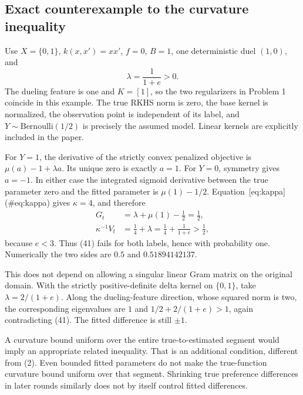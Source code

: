 \documentclass[10pt]{article}
\begin{document}
\subsection*{Exact counterexample to the curvature inequality}
Use \(X=\{0,1\}\), \(k(x,x')=xx'\), \(f=0\), \(B=1\), one deterministic duel \((1,0)\), and \[\lambda=\frac1{1+e}>0.\] The dueling feature is one and \(K=[1]\), so the two regularizers in Problem 1 coincide in this example. The true RKHS norm is zero, the base kernel is normalized, the observation point is independent of its label, and \(Y\sim\mathrm{Bernoulli}(1/2)\) is precisely the assumed model. Linear kernels are explicitly included in the paper.\par
For \(Y=1\), the derivative of the strictly convex penalized objective is \(\mu(a)-1+\lambda a\). Its unique zero is exactly \(a=1\). For \(Y=0\), symmetry gives \(a=-1\). In either case the integrated sigmoid derivative between the true parameter zero and the fitted parameter is \(\mu(1)-1/2\). Equation [eq:kappa] (\#eq:kappa) gives \(\kappa=4\), and therefore \[\begin{aligned}
G_t&=\lambda+\mu(1)-\tfrac12=\tfrac12,\\
\kappa^{-1}V_t&=\tfrac14+\lambda
=\tfrac14+\frac1{1+e}>\tfrac12 ,\end{aligned}\] because \(e<3\). Thus (41) fails for both labels, hence with probability one. Numerically the two sides are \(0.5\) and \(0.51894142137\).\par
This does not depend on allowing a singular linear Gram matrix on the original domain. With the strictly positive-definite delta kernel on \(\{0,1\}\), take \(\lambda=2/(1+e)\). Along the dueling-feature direction, whose squared norm is two, the corresponding eigenvalues are \(1\) and \(1/2+2/(1+e)>1\), again contradicting (41). The fitted difference is still \(\pm1\).\par
A curvature bound uniform over the entire true-to-estimated segment would imply an appropriate related inequality. That is an additional condition, different from (2). Even bounded fitted parameters do not make the true-function curvature bound uniform over that segment. Shrinking true preference differences in later rounds similarly does not by itself control fitted differences.\par
\end{document}
